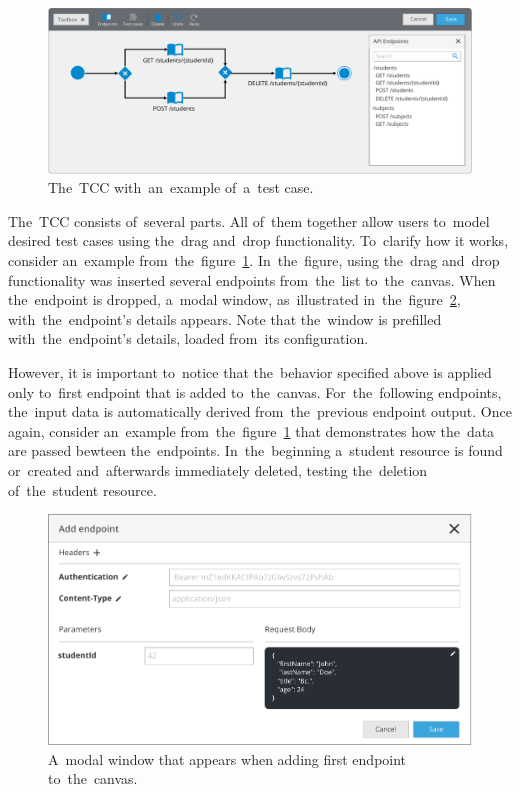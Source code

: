\begin{figure}[!hbt]
	\centering
	\includegraphics[scale=0.65]{./designs/test-case.pdf}
	\caption{The~TCC with~an~example of~a~test case.}
	\label{fig-test-case}
\end{figure}

The~TCC consists of~several parts. All of~them together allow users to~model desired
test cases using the~drag and~drop functionality. To~clarify how it works, consider an~example
from~the~figure~\ref{fig-test-case}. In~the~figure, using the~drag and~drop functionality was
inserted several endpoints from~the~list to~the~canvas. When the~endpoint is dropped, a~modal window, as~illustrated in~the~figure~\ref{fig-add-endpoint}, 
with~the~endpoint's details appears. Note that the~window is prefilled with~the~endpoint's details,
loaded from~its configuration.

However, it is important to~notice that the~behavior specified above is applied only to~first
endpoint that is added to~the~canvas. For~the~following endpoints, the~input data is
automatically derived from~the~previous endpoint output. Once again, consider an~example
from~the~figure~\ref{fig-test-case} that demonstrates how the~data are passed bewteen the~endpoints.
In~the~beginning a~student resource is found or~created and~afterwards immediately deleted, testing 
the~deletion of~the~student resource.

\begin{figure}[!hbt]
	\centering
	\includegraphics[scale=0.7]{./designs/add-endpoint.pdf}
	\caption{A~modal window that appears when adding first endpoint to~the~canvas.}
	\label{fig-add-endpoint}
\end{figure}



